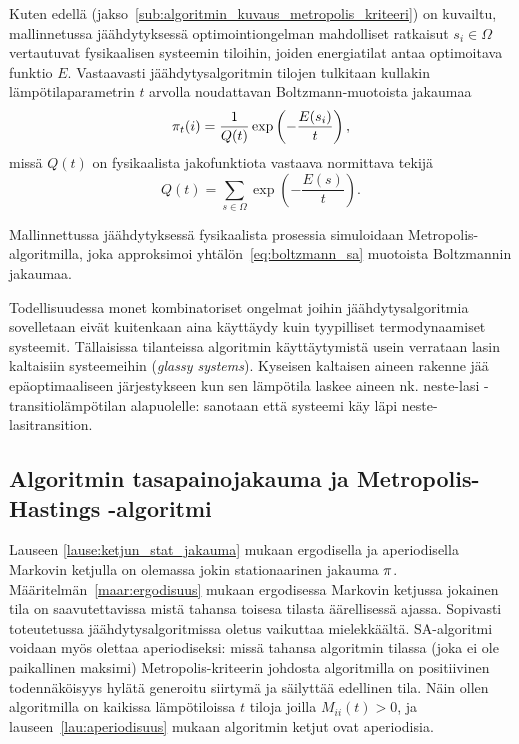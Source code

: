 Kuten edellä (jakso~\ref{sub:algoritmin_kuvaus_metropolis_kriteeri}) on kuvailtu,
mallinnetussa jäähdytyksessä optimointiongelman mahdolliset ratkaisut $s_i \in \Omega$ vertautuvat fysikaalisen systeemin tiloihin,
joiden energiatilat antaa optimoitava funktio $E$.
Vastaavasti jäähdytysalgoritmin tilojen tulkitaan kullakin lämpötilaparametrin $t$ arvolla noudattavan Boltzmann-muotoista jakaumaa
\begin{equation}
    \label{eq:boltzmann_sa}
    \mathbf{\pi}_t(i) = \frac{1}{Q(t)} \exp \left(-\frac{E(s_i)}{t}\right),
\end{equation}
missä $Q(t)$ on fysikaalista jakofunktiota vastaava normittava tekijä
\begin{equation}
    Q(t) = \sum_{s \in \Omega} \exp \left(-\frac{E(s)}{t}\right).
\end{equation}

Mallinnettussa jäähdytyksessä fysikaalista prosessia simuloidaan Metropolis-algoritmilla,
joka approksimoi yhtälön~\ref{eq:boltzmann_sa} muotoista Boltzmannin jakaumaa.

Todellisuudessa monet kombinatoriset ongelmat joihin jäähdytysalgoritmia sovelletaan eivät kuitenkaan aina käyttäydy kuin tyypilliset termodynaamiset systeemit.
Tällaisissa tilanteissa algoritmin käyttäytymistä usein verrataan lasin kaltaisiin systeemeihin (\emph{glassy systems}).
Kyseisen kaltaisen aineen rakenne jää epäoptimaaliseen järjestykseen kun sen lämpötila laskee aineen nk. neste-lasi -transitiolämpötilan alapuolelle:
sanotaan että systeemi käy läpi neste-lasitransition.
\cite[][luku 6.6]{salamonetal}

\subsection{Algoritmin tasapainojakauma ja Metropolis-Hastings -algoritmi}
\label{sub:metropolis_hastings_algoritmi}

Lauseen \ref{lause:ketjun_stat_jakauma} mukaan ergodisella ja aperiodisella Markovin ketjulla on olemassa jokin stationaarinen jakauma $\mathbf{\pi}$.
Määritelmän~\ref{maar:ergodisuus} mukaan ergodisessa Markovin ketjussa jokainen tila on saavutettavissa mistä tahansa toisesa tilasta äärellisessä ajassa.
Sopivasti toteutetussa jäähdytysalgoritmissa oletus vaikuttaa mielekkäältä.
SA-algoritmi voidaan myös olettaa aperiodiseksi:
missä tahansa algoritmin tilassa (joka ei ole paikallinen maksimi) Metropolis-kriteerin johdosta
algoritmilla on positiivinen todennäköisyys hylätä generoitu siirtymä ja säilyttää edellinen tila.
Näin ollen algoritmilla on kaikissa lämpötiloissa $t$ tiloja joilla $M_{ii}(t) > 0$,
ja lauseen~\ref{lau:aperiodisuus} mukaan algoritmin ketjut ovat aperiodisia.

